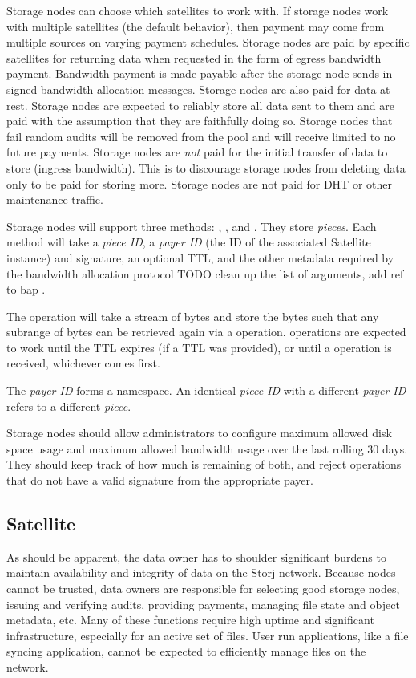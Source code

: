 \documentclass[a4paper,10pt]{article} \usepackage[utf8]{inputenc}
\newcommand{\todo}[1]{{\color{red} TODO #1 }}
\begin{document}
Storage nodes can choose which satellites to work with. If storage nodes work
with
multiple satellites (the default behavior), then payment may come from
multiple sources on varying payment schedules.
Storage nodes are paid by specific satellites for returning data when
requested in
the form of egress bandwidth payment. Bandwidth payment is made payable after
the storage node sends in signed bandwidth allocation messages.
Storage nodes are also paid for data at rest.
Storage nodes are expected to reliably store all data sent to them and are
paid
with the assumption that they are faithfully doing so.
Storage nodes that fail random audits will be removed from the pool and will
receive
limited to no future payments.
Storage nodes are {\em not} paid for the initial transfer of data to store
(ingress
bandwidth). This is to discourage storage nodes from deleting data only to be
paid for
storing more. Storage nodes are not paid for DHT or other maintenance traffic.

Storage nodes will support three methods: , , and
. They store {\em pieces}.
Each method will take a {\em piece ID}, a {\em payer ID} (the ID of the
associated Satellite instance) and signature, an optional TTL,
and the other metadata required by the bandwidth allocation protocol
\todo{clean up the list of arguments, add ref to bap}.

The  operation will take a stream of bytes and store the bytes such
that any subrange of bytes can be retrieved again via a  operation.
 operations are expected to work until the TTL expires (if a TTL was
provided), or until a  operation is received, whichever comes
first.

The {\em payer ID} forms a namespace. An identical {\em piece ID} with a
different {\em payer ID} refers to a different {\em piece}.

Storage nodes should allow administrators to configure maximum allowed disk
space usage and maximum allowed bandwidth usage over the last rolling 30 days.
They should keep track of how much is remaining of both, and reject operations
that do not have a valid signature from the appropriate payer.

\subsection{Satellite}

As should be apparent, the data owner has to shoulder significant burdens
to maintain availability and integrity of data on the Storj network. Because
nodes cannot be trusted, data owners are responsible for selecting good
storage nodes, issuing and verifying audits, providing payments, managing file
state
and object metadata, etc. Many of these functions require high uptime and
significant infrastructure, especially for an active set of files. User run
applications, like a file syncing application, cannot be expected to efficiently
manage files on the network.
\end{document}
